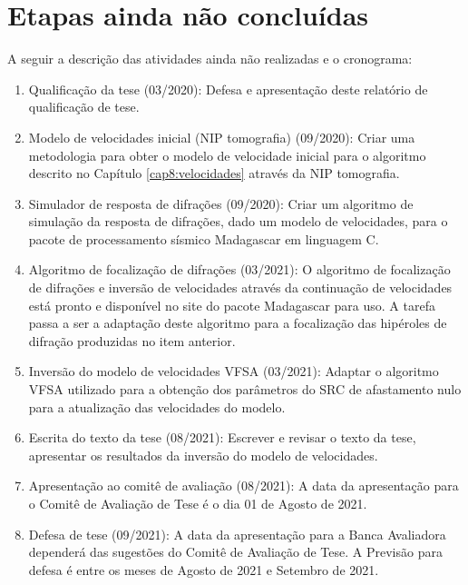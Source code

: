 \section{Etapas ainda não concluídas}

A seguir a descrição das atividades ainda não realizadas e o cronograma:

  \begin{enumerate}
   \item Qualificação da tese (03/2020): Defesa e apresentação deste relatório de qualificação de tese.
   \item   Modelo de velocidades inicial (NIP tomografia) (09/2020): Criar uma metodologia para
   obter o modelo de velocidade inicial para o algoritmo
   descrito no Capítulo \ref{cap8:velocidades} através da NIP tomografia.
    \item Simulador de resposta de difrações (09/2020): Criar um algoritmo de simulação da resposta de difrações, dado
    um modelo de velocidades, para o pacote de processamento sísmico Madagascar em linguagem C.
    \item  Algoritmo de focalização de difrações (03/2021): O algoritmo de focalização de difrações e inversão de velocidades
    através da continuação de velocidades está pronto e disponível no site do pacote Madagascar para uso. A tarefa passa a ser
    a adaptação deste algoritmo para a focalização das hipéroles de difração produzidas no item anterior.
    \item  Inversão do modelo de velocidades VFSA (03/2021): Adaptar o algoritmo VFSA utilizado para a obtenção dos parâmetros
    do SRC de afastamento nulo para a atualização das velocidades do modelo.
    \item  Escrita do texto da tese (08/2021): Escrever e revisar o texto da tese, apresentar os resultados da
    inversão do modelo de velocidades.
     \item Apresentação ao comitê de avaliação (08/2021): A data da apresentação para o Comitê de Avaliação de Tese 
     é o dia 01 de Agosto de 2021.
    \item  Defesa de tese (09/2021): A data da apresentação para a Banca Avaliadora dependerá das sugestões do
    Comitê de Avaliação de Tese. A Previsão para defesa é entre os meses de Agosto de
    2021 e Setembro de 2021.
  \end{enumerate}
  
